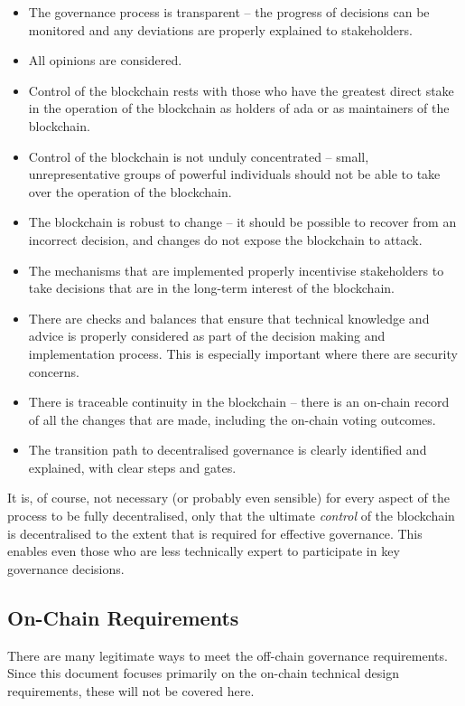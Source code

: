 \begin{itemize}
\item
  The governance process is transparent -- the progress of decisions can be monitored and any deviations are properly explained to stakeholders.
\item
  All opinions are considered.
\item
  Control of the blockchain rests with those who have the greatest direct stake in the operation of the blockchain as holders of ada or as maintainers of the blockchain.
\item
  Control of the blockchain is not unduly concentrated -- small, unrepresentative groups of powerful individuals should not be able to take over the operation
  of the blockchain.
\item
  The blockchain is robust to change -- it should be possible to recover from an incorrect decision, and changes do not expose the blockchain to attack.
\item
  The mechanisms that are implemented properly incentivise stakeholders to take decisions that are in the long-term interest of the blockchain.
\item
  There are checks and balances that ensure that technical knowledge and advice is properly considered as part of the decision making and implementation process.
  This is especially important where there are security concerns.
\item
  There is traceable continuity in the blockchain -- there is an on-chain record of all the changes that are made, including the on-chain voting outcomes.
\item
  The transition path to decentralised governance is clearly identified and explained, with clear steps and gates.
\end{itemize}


It is, of course, not necessary (or probably even sensible) for every aspect of
the process to be fully decentralised, only that the ultimate \emph{control} of
the blockchain is decentralised to the extent that is required for effective
governance.  This enables even those who are less technically expert to participate in
key governance decisions.

\pagebreak
\subsection{On-Chain Requirements}

There are many legitimate ways to meet the off-chain governance requirements.  Since this document focuses primarily on the on-chain technical design requirements, these will not be covered here.

